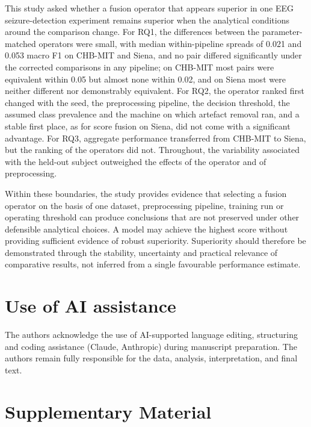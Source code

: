\documentclass[11pt,a4paper]{article}
\newcounter{none} %
\begin{document}
This study asked whether a fusion operator that appears superior in one EEG
seizure-detection experiment remains superior when the analytical conditions around the
comparison change. For RQ1, the differences between the parameter-matched operators were
small, with median within-pipeline spreads of 0.021 and 0.053 macro F1 on CHB-MIT and
Siena, and no pair differed significantly under the corrected comparisons in any
pipeline; on CHB-MIT most pairs were equivalent within 0.05 but almost none within 0.02,
and on Siena most were neither different nor demonstrably equivalent. For RQ2, the
operator ranked first changed with the seed, the preprocessing pipeline, the decision
threshold, the assumed class prevalence and the machine on which artefact removal ran,
and a stable first place, as for score fusion on Siena, did not come with a significant
advantage. For RQ3, aggregate performance transferred from CHB-MIT to Siena, but the
ranking of the operators did not. Throughout, the variability associated with the
held-out subject outweighed the effects of the operator and of preprocessing.

Within these boundaries, the study provides evidence that selecting a fusion operator on
the basis of one dataset, preprocessing pipeline, training run or operating threshold can
produce conclusions that are not preserved under other defensible analytical choices. A
model may achieve the highest score without providing sufficient evidence of robust
superiority. Superiority should therefore be demonstrated through the stability,
uncertainty and practical relevance of comparative results, not inferred from a single
favourable performance estimate.

\section{Use of AI assistance}\label{use-of-ai-assistance}

The authors acknowledge the use of AI-supported language editing, structuring and
coding assistance (Claude, Anthropic) during manuscript preparation. The authors remain
fully responsible for the data, analysis, interpretation, and final text.




\clearpage
\section*{Supplementary Material}
\setcounter{table}{0}
\renewcommand{\thetable}{S\arabic{table}}
\renewcommand{\theHtable}{S\arabic{table}}
\setcounter{figure}{0}
\renewcommand{\thefigure}{S\arabic{figure}}
\renewcommand{\theHfigure}{S\arabic{figure}}
\end{document}
